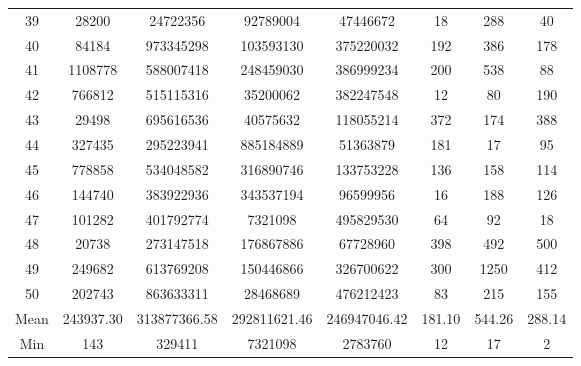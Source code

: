 \documentclass[11pt]{scrartcl}
\theoremstyle{dotlessP}
\theoremstyle{dotlessN}
\theoremstyle{dotN}
\begin{document}
\begin{table}[H]
{\begin{tabular}{c|c|c|c|c|c|c|c}
39            & 28200       & 24722356        & 92789004      & 47446672            & 18                 & 288              & 40                     \\
40            & 84184       & 973345298       & 103593130     & 375220032           & 192                & 386              & 178                    \\
41            & 1108778     & 588007418       & 248459030     & 386999234           & 200                & 538              & 88                     \\
42            & 766812      & 515115316       & 35200062      & 382247548           & 12                 & 80               & 190                    \\
43            & 29498       & 695616536       & 40575632      & 118055214           & 372                & 174              & 388                    \\
44            & 327435      & 295223941       & 885184889     & 51363879            & 181                & 17               & 95                     \\
45            & 778858      & 534048582       & 316890746     & 133753228           & 136                & 158              & 114                    \\
46            & 144740      & 383922936       & 343537194     & 96599956            & 16                 & 188              & 126                    \\
47            & 101282      & 401792774       & 7321098       & 495829530           & 64                 & 92               & 18                     \\
48            & 20738       & 273147518       & 176867886     & 67728960            & 398                & 492              & 500                    \\
49            & 249682      & 613769208       & 150446866     & 326700622           & 300                & 1250             & 412                    \\
50            & 202743      & 863633311       & 28468689      & 476212423           & 83                 & 215              & 155                    \\
\hline
Mean          & 243937.30   & 313877366.58    & 292811621.46  & 246947046.42        & 181.10             & 544.26           & 288.14                 \\
Min           & 143         & 329411          & 7321098       & 2783760             & 12                 & 17               & 2                      \\

\end{tabular}}
\end{table}
\end{document}
